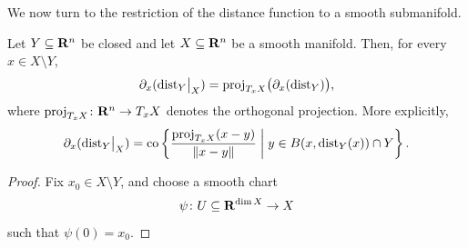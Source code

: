 We now turn to the restriction of the distance function to a smooth submanifold.

\begin{proposition}
\label{D!propo:subgradient2}
  Let $Y \subseteq \mathbf{R}^n$ be closed and let $X \subseteq \mathbf{R}^n$ be a smooth manifold. Then, for every $x \in X \setminus Y$,
  \[
    \partial_x(\mathord{\operatorname{dist}}_Y\big|_X)=\mathrm{proj}_{T_xX}\bigl(\partial_x(\operatorname{dist}_Y)\bigr),
  \]
  where $\mathrm{proj}_{T_xX}\colon \mathbf{R}^n \to T_xX$ denotes the orthogonal projection. More explicitly,
  \[
    \partial_x(\mathord{\operatorname{dist}}_Y\big|_X)
    =
    \mathrm{co}\left\{
    \frac{\mathrm{proj}_{T_xX}(x-y)}{\|x-y\|}
    \;\middle|\;
    y \in B(x,\operatorname{dist}_Y(x)) \cap Y
    \right\}.
  \]
\end{proposition}

\begin{proof}
  Fix $x_0 \in X \setminus Y$, and choose a smooth chart
  \[
    \psi \colon U \subseteq \mathbf{R}^{\dim X} \to X
  \]
  such that $\psi(0)=x_0$.


\end{proof}
